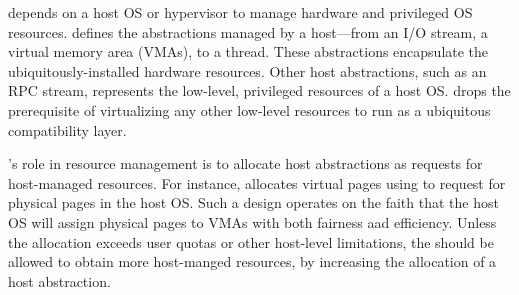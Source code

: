 \label{sec:libos:resource}


\Thelibos{}
depends on a host OS or hypervisor to manage hardware and privileged OS resources.
\Thehostabi{}
defines the abstractions managed by a host---from an I/O stream, a virtual memory area (VMAs), to a thread. %
These abstractions encapsulate the ubiquitously-installed hardware resources.
Other host abstractions, %
such as an RPC stream,
represents the low-level, privileged resources of a host OS.
\graphene{} drops the prerequisite of virtualizing %
any other low-level resources to run \thelibos{}
as a ubiquitous compatibility layer.




\thelibos{}'s role in resource management
is to allocate host abstractions
as requests %
for host-managed resources.
For instance, \thelibos{} allocates virtual pages using \thehostabi{} to request for physical pages in the host OS.
Such a \libos{} design operates on the faith that the host OS will assign physical pages to VMAs with both fairness aad efficiency.
Unless the allocation exceeds user quotas or other host-level limitations,
the \libos{} should be allowed to obtain more host-manged resources,
by increasing the allocation of a host abstraction.



